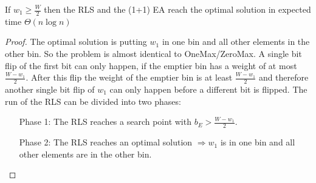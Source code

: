 \begin{theorem}\label{theo:OneMaxResult}
    If $w_1 \ge \frac W 2$  then the RLS and the (1+1) EA reach the optimal solution in expected time $\Theta(n\log{}n)$
\end{theorem}
\begin{proof}
    The optimal solution is putting $w_1$ in one bin and all other elements in the other bin.
    So the problem is almost identical to OneMax/ZeroMax.
    A single bit flip of the first bit can only happen, if the emptier bin has a weight of at most $\frac {W-w_1}{2}$.
    After this flip the weight of the emptier bin is at least $\frac {W-w_1}{2}$ and therefore another single bit flip of $w_1$ can only happen before a different bit is flipped.
    The run of the RLS can be divided into two phases:
    \begin{itemize}
        \item[Phase 1:] The RLS reaches a search point with $b_E > \frac {W-w_1}{2}$.
        \item[Phase 2:] The RLS reaches an optimal solution $\Rightarrow w_1$ is in one bin and all other elements are in the other bin.
    \end{itemize}


\end{proof}
